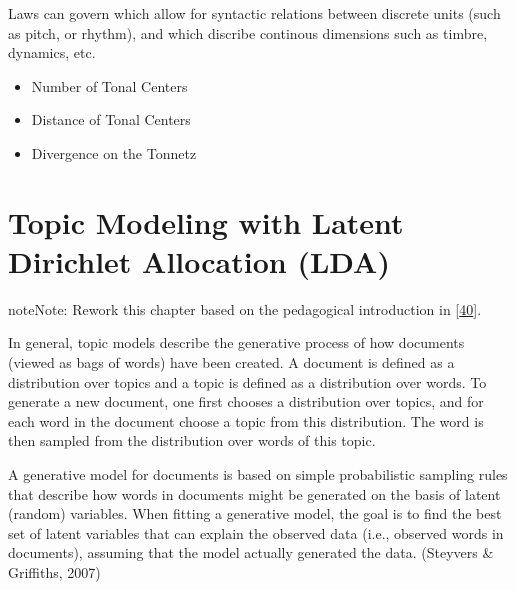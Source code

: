 \documentclass[letterpaper,10pt,english]{sphinxmanual}
\begin{document}
\sphinxAtStartPar
Laws can govern  which allow for syntactic relations
between discrete units (such as pitch, or rhythm), and  which discribe continous dimensions such as timbre,
dynamics, etc.

\sphinxAtStartPar
{}
\begin{itemize}
\item {} 
\sphinxAtStartPar
Number of Tonal Centers

\item {} 
\sphinxAtStartPar
Distance of Tonal Centers

\item {} 
\sphinxAtStartPar
Divergence on the Tonnetz

\end{itemize}


\chapter{Topic Modeling with Latent Dirichlet Allocation (LDA)}
\label{\detokenize{topic_modeling:topic-modeling-with-latent-dirichlet-allocation-lda}}\label{\detokenize{topic_modeling::doc}}
\begin{sphinxadmonition}{note}{Note:}
\sphinxAtStartPar
Rework this chapter based on the pedagogical introduction
in {[}\hyperlink{cite.8_bibliography:id15}{40}{]}.
\end{sphinxadmonition}

\sphinxAtStartPar
{}

\sphinxAtStartPar
In general, topic models describe the generative process of how
documents (viewed as bags of words) have been created. A document is
defined as a distribution over topics and a topic is defined as a
distribution over words. To generate a new document, one first chooses a
distribution over topics, and for each word in the document choose a
topic from this distribution. The word is then sampled from the
distribution over words of this topic.

\sphinxAtStartPar
A generative model for documents is based on simple probabilistic
sampling rules that describe how words in documents might be
generated on the basis of latent (random) variables. When fitting a
generative model, the goal is to find the best set of latent
variables that can explain the observed data (i.e., observed words
in documents), assuming that the model actually generated the data.
(Steyvers \& Griffiths, 2007)
\end{document}
